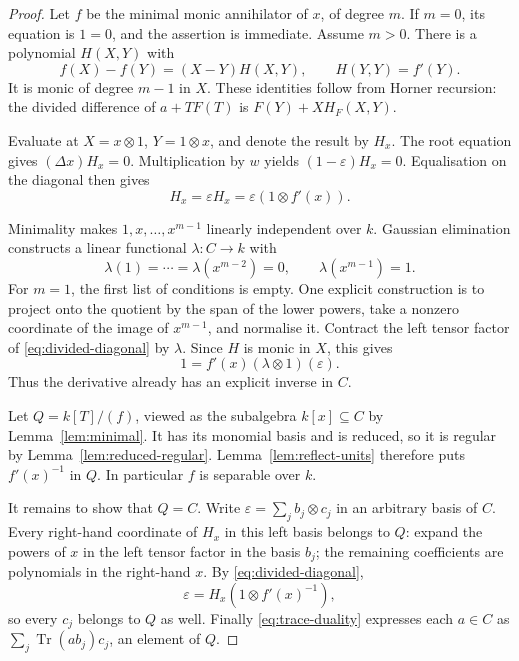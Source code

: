 \documentclass[11pt]{article}
\theoremstyle{definition}
\theoremstyle{remark}
\newcommand{\Tr}{\operatorname{Tr}}
\newcommand{\eps}{\varepsilon}
\newcommand{\Del}{\Delta}
\begin{document}
\begin{proof}
Let $f$ be the minimal monic annihilator of $x$, of degree $m$.
If $m=0$, its equation is $1=0$, and the assertion is immediate.
Assume $m>0$. There is a polynomial $H(X,Y)$ with
\[
 f(X)-f(Y)=(X-Y)H(X,Y),\qquad H(Y,Y)=f'(Y).
\]
It is monic of degree $m-1$ in $X$. These identities follow from
Horner recursion: the divided difference of $a+TF(T)$ is
$F(Y)+XH_F(X,Y)$.

Evaluate at $X=x\otimes1$, $Y=1\otimes x$, and denote the result
by $H_x$. The root equation gives $(\Del x)H_x=0$. Multiplication
by $w$ yields $(1-\eps)H_x=0$. Equalisation on the diagonal then gives
\begin{equation}\label{eq:divided-diagonal}
 H_x=\eps H_x=\eps(1\otimes f'(x)).
\end{equation}

Minimality makes $1,x,\ldots,x^{m-1}$ linearly independent over $k$.
Gaussian elimination constructs a linear functional $\lambda:C\to k$
with
\[
 \lambda(1)=\cdots=\lambda(x^{m-2})=0,
 \qquad \lambda(x^{m-1})=1.
\]
For $m=1$, the first list of conditions is empty. One explicit
construction is to project onto the quotient by the span of the lower
powers, take a nonzero coordinate of the image of $x^{m-1}$, and
normalise it. Contract the left tensor factor of
\eqref{eq:divided-diagonal} by $\lambda$. Since $H$ is monic in $X$,
this gives
\begin{equation}\label{eq:derivative-inverse}
 1=f'(x)(\lambda\otimes1)(\eps).
\end{equation}
Thus the derivative already has an explicit inverse in $C$.

Let $Q=k[T]/(f)$, viewed as the subalgebra $k[x]\subseteq C$
by Lemma~\ref{lem:minimal}. It has its monomial basis and is reduced,
so it is regular by Lemma~\ref{lem:reduced-regular}.
Lemma~\ref{lem:reflect-units} therefore puts $f'(x)^{-1}$ in $Q$.
In particular $f$ is separable over $k$.

It remains to show that $Q=C$. Write $\eps=\sum_j b_j\otimes c_j$
in an arbitrary basis of $C$. Every right-hand coordinate of $H_x$
in this left basis belongs to $Q$: expand the powers of $x$ in the
left tensor factor in the basis $b_j$; the remaining coefficients
are polynomials in the right-hand $x$. By \eqref{eq:divided-diagonal},
\[
 \eps=H_x(1\otimes f'(x)^{-1}),
\]
so every $c_j$ belongs to $Q$ as well. Finally
\eqref{eq:trace-duality} expresses each $a\in C$ as
$\sum_j\Tr(ab_j)c_j$, an element of $Q$.
\end{proof}
\end{document}
